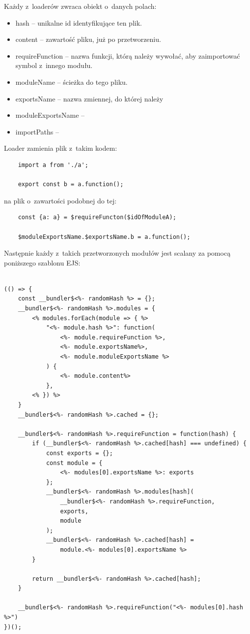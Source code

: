 \documentclass{SGGW-thesis}
\begin{document}
Każdy z~loaderów zwraca obiekt o~danych polach:
\begin{itemize}
    \item hash -- unikalne id identyfikujące ten plik.
    \item content -- zawartość pliku, już po przetworzeniu.
    \item requireFunction -- nazwa funkcji, którą należy wywołać, aby zaimportować symbol z~innego modułu.
    \item moduleName -- ścieżka do tego pliku.
    \item exportsName -- nazwa zmiennej, do której należy 
    \item moduleExportsName -- 
    \item importPaths --
\end{itemize}

Loader zamienia plik z~takim kodem:
\begin{verbatim}
    import a from './a';

    export const b = a.function();
\end{verbatim}

na plik o~zawartości podobnej do tej:
\begin{verbatim}
    const {a: a} = $requireFuncton($idOfModuleA);

    $moduleExportsName.$exportsName.b = a.function();
\end{verbatim}

Następnie każdy z~takich przetworzonych modułów jest scalany za pomocą poniższego szablonu EJS:
\begin{verbatim}
    
(() => {
    const __bundler$<%- randomHash %> = {};
    __bundler$<%- randomHash %>.modules = {
        <% modules.forEach(module => { %>
            "<%- module.hash %>": function(
                <%- module.requireFunction %>,
                <%- module.exportsName%>,
                <%- module.moduleExportsName %>
            ) {
                <%- module.content%>
            },
        <% }) %>
    }
    __bundler$<%- randomHash %>.cached = {};

    __bundler$<%- randomHash %>.requireFunction = function(hash) {
        if (__bundler$<%- randomHash %>.cached[hash] === undefined) {
            const exports = {};
            const module = {
                <%- modules[0].exportsName %>: exports
            };
            __bundler$<%- randomHash %>.modules[hash](
                __bundler$<%- randomHash %>.requireFunction,
                exports,
                module
            );
            __bundler$<%- randomHash %>.cached[hash] =
                module.<%- modules[0].exportsName %>
        }

        return __bundler$<%- randomHash %>.cached[hash];
    }

    __bundler$<%- randomHash %>.requireFunction("<%- modules[0].hash %>")
})();
\end{verbatim}
\end{document}
